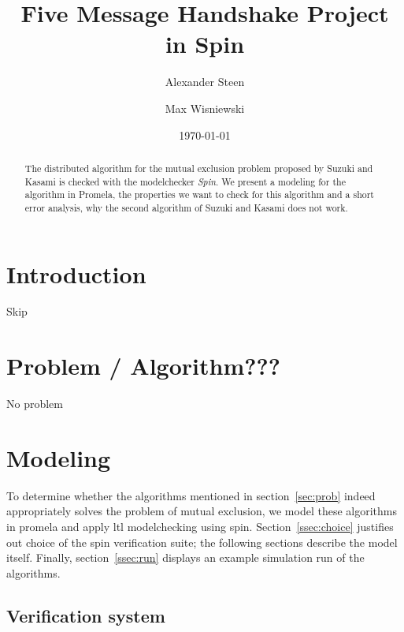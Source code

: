 \documentclass{llncs}
\title{Five Message Handshake Project in Spin}
\author{Alexander Steen \and Max Wisniewski}
\date{\today}
\institute{Institut f\"ur Informatik, FU Berlin}
\begin{document}
\maketitle

\begin{abstract}
The distributed algorithm for the mutual exclusion problem proposed by Suzuki and Kasami \cite{Suzuki:1985:DME:6110.214406} is checked
with the modelchecker \emph{Spin}. We present a modeling for the algorithm in Promela, the properties we want
to check for this algorithm and a short error analysis, why the second algorithm of Suzuki and Kasami does not work.
\end{abstract}



\section{Introduction}

Skip



\section{Problem / Algorithm??? \label{sec:prob}}

No problem



\section{Modeling\label{sec:model}}

To determine whether the algorithms mentioned in section~\ref{sec:prob} indeed appropriately solves
the problem of mutual exclusion, we model these algorithms in promela and apply ltl modelchecking using spin.
Section~\ref{ssec:choice} justifies out choice of the spin verification suite; the following sections
describe the model itself. Finally, section~\ref{ssec:run} displays an example simulation run of the algorithms.

\subsection{Verification system~\label{ssec:choice}}
\end{document}

